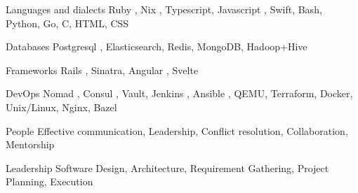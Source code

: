 
\begin{cvskills}

  \cvskill
    {Languages and dialects} %
    {Ruby \cvstar, Nix \cvstar, Typescript, Javascript \cvstar, Swift, Bash, Python, Go, C, HTML, CSS} %

  \cvskill
    {Databases} %
    {Postgresql \cvstar, Elasticsearch, Redis, MongoDB, Hadoop+Hive} %

  \cvskill
    {Frameworks} %
    {Rails \cvstar, Sinatra, Angular \cvstar, Svelte} %

  \cvskill
    {DevOps} %
    {Nomad \cvstar, Consul \cvstar, Vault, Jenkins \cvstar, Ansible \cvstar, QEMU, Terraform, Docker, Unix/Linux, Nginx, Bazel \cvstar} %

  \cvskill
    {People} %
    {Effective communication, Leadership, Conflict resolution, Collaboration, Mentorship} %


  \cvskill
    {Leadership} %
    {Software Design, Architecture, Requirement Gathering, Project Planning, Execution} %

\end{cvskills}
